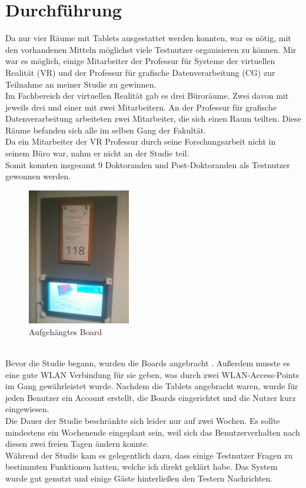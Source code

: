 \section{Durchführung}\label{Durchführung}
Da nur vier Räume mit Tablets ausgestattet werden konnten, war es nötig, mit den vorhandenen Mitteln möglichst viele Testnutzer organisieren zu können.
Mir war es möglich, einige Mitarbeiter der Professur für Systeme der virtuellen Realität (VR) und der Professur für grafische Datenverarbeitung (CG) zur Teilnahme an meiner Studie zu gewinnen.
\\
Im Fachbereich der virtuellen Realität gab es drei Büroräume.
Zwei davon mit jeweils drei und einer mit zwei Mitarbeitern.
An der Professur für grafische Datenverarbeitung arbeiteten zwei Mitarbeiter, die sich einen Raum teilten.
Diese Räume befanden sich alle im selben Gang der Fakultät.
\\
Da ein Mitarbeiter der VR Professur durch seine Forschungsarbeit nicht in seinem Büro war, nahm er nicht an der Studie teil.
\\
Somit konnten insgesamt 9 Doktoranden und Post-Doktoranden als Testnutzer gewonnen werden.
\begin{figure}[h!]
  \centering
  \includegraphics[width=0.4\textwidth]{./img/StudieAufgehaengtesBoard.jpg}
  \caption{Aufgehängtes Board}
  \label{img:StudieAufgehaengesBoard}
\end{figure}
\\
Bevor die Studie begann, wurden die Boards angebracht .
Außerdem musste es eine gute WLAN Verbindung für sie geben, was durch zwei WLAN-Access-Points im Gang gewährleistet wurde.
Nachdem die Tablets angebracht waren, wurde für jeden Benutzer ein Account erstellt, die Boards eingerichtet und die Nutzer kurz eingewiesen.
\\
Die Dauer der Studie beschränkte sich leider nur auf zwei Wochen.
Es sollte mindestens ein Wochenende eingeplant sein, weil sich das Benutzerverhalten nach diesen zwei freien Tagen ändern konnte.
\\
Während der Studie kam es gelegentlich dazu, dass einige Testnutzer Fragen zu bestimmten Funktionen hatten, welche ich direkt geklärt habe.
Das System wurde gut genutzt und einige Gäste hinterließen den Testern Nachrichten.



